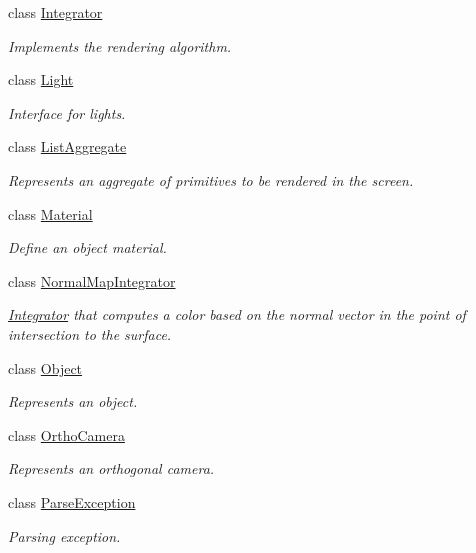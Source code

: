 \begin{DoxyCompactItemize}
class \mbox{\hyperlink{classomg_1_1_integrator}{Integrator}}
\begin{DoxyCompactList}\small\item\em Implements the rendering algorithm. \end{DoxyCompactList}\item 
class \mbox{\hyperlink{classomg_1_1_light}{Light}}
\begin{DoxyCompactList}\small\item\em Interface for lights. \end{DoxyCompactList}\item 
class \mbox{\hyperlink{classomg_1_1_list_aggregate}{List\+Aggregate}}
\begin{DoxyCompactList}\small\item\em Represents an aggregate of primitives to be rendered in the screen. \end{DoxyCompactList}\item 
class \mbox{\hyperlink{classomg_1_1_material}{Material}}
\begin{DoxyCompactList}\small\item\em Define an object material. \end{DoxyCompactList}\item 
class \mbox{\hyperlink{classomg_1_1_normal_map_integrator}{Normal\+Map\+Integrator}}
\begin{DoxyCompactList}\small\item\em \mbox{\hyperlink{classomg_1_1_integrator}{Integrator}} that computes a color based on the normal vector in the point of intersection to the surface. \end{DoxyCompactList}\item 
class \mbox{\hyperlink{classomg_1_1_object}{Object}}
\begin{DoxyCompactList}\small\item\em Represents an object. \end{DoxyCompactList}\item 
class \mbox{\hyperlink{classomg_1_1_ortho_camera}{Ortho\+Camera}}
\begin{DoxyCompactList}\small\item\em Represents an orthogonal camera. \end{DoxyCompactList}\item 
class \mbox{\hyperlink{classomg_1_1_parse_exception}{Parse\+Exception}}
\begin{DoxyCompactList}\small\item\em Parsing exception. \end{DoxyCompactList}\item 

\end{DoxyCompactItemize}
